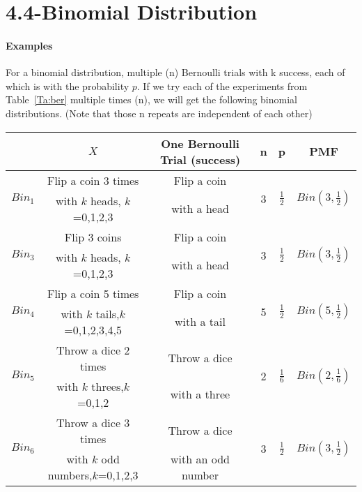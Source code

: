 \documentclass{article} %
\begin{document}
\newpage 

\section*{4.4-Binomial Distribution}

\paragraph*{Examples} For a binomial distribution, multiple (n) Bernoulli trials with k success, each of which is with the probability $p$. If we try each of the experiments from Table~\ref{Ta:ber} multiple times (n), we will get the following binomial distributions. (Note that those n repeats are independent of each other)
\begin{table}[h!]
\begin{center}
\renewcommand{\arraystretch}{1.5}
\begin{tabular}{|c|c|c|c|c|c|} \hline
& $X$ & One Bernoulli Trial (success) & n & p & PMF \\ \hline
\multirow{2}{*}{$Bin_1$} & {Flip a coin 3 times} & {Flip a coin} & \multirow{2}{*}{3} & \multirow{2}{*}{$\frac{1}{2}$} & \multirow{2}{*}{$Bin(3,\frac{1}{2})$} \\
& with $k$ heads, $k$=0,1,2,3 & with a head & & & \\  \hline
\multirow{2}{*}{$Bin_3$} & {Flip 3 coins} & {Flip a coin} & \multirow{2}{*}{3} & \multirow{2}{*}{$\frac{1}{2}$} & \multirow{2}{*}{$Bin(3,\frac{1}{2})$} \\
& with $k$ heads, $k$=0,1,2,3 & with a head & & & \\  \hline
\multirow{2}{*}{$Bin_4$} & {Flip a coin 5 times} & {Flip a coin} & \multirow{2}{*}{5} & \multirow{2}{*}{$\frac{1}{2}$} & \multirow{2}{*}{$Bin(5,\frac{1}{2})$} \\
&  with $k$ tails,$k$=0,1,2,3,4,5 & with a tail & & & \\  \hline
\multirow{2}{*}{$Bin_5$} & {Throw a dice 2 times} & {Throw a dice} & \multirow{2}{*}{2} & \multirow{2}{*}{$\frac{1}{6}$} & \multirow{2}{*}{$Bin(2,\frac{1}{6})$} \\
&  with $k$ threes,$k$=0,1,2 &  with a three & & & \\ \hline
\multirow{2}{*}{$Bin_6$} & {Throw a dice 3 times}  & {Throw a dice} & \multirow{2}{*}{3} & \multirow{2}{*}{$\frac{1}{2}$} & \multirow{2}{*}{$Bin(3,\frac{1}{2})$} \\
& with $k$ odd numbers,$k$=0,1,2,3 &  with an odd number  & & & \\ \hline

\end{tabular}
\end{center}
\end{table}
\end{document}
